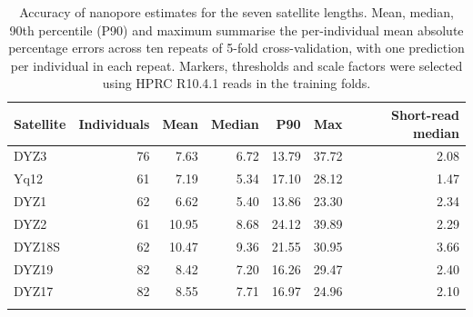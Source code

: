 \begin{table}[tbp]
\caption{Accuracy of nanopore estimates for the seven satellite lengths. Mean, median, 90th percentile (P90) and maximum summarise the per-individual mean absolute percentage errors across ten repeats of 5-fold cross-validation, with one prediction per individual in each repeat. Markers, thresholds and scale factors were selected using HPRC R10.4.1 reads in the training folds.}\label{tab:ont}
\centering\small
\begin{tabular}{lrrrrrr}
\toprule
Satellite & Individuals & Mean & Median & P90 & Max & Short-read median \\
\midrule
DYZ3 & 76 & 7.63 & 6.72 & 13.79 & 37.72 & 2.08 \\
Yq12 & 61 & 7.19 & 5.34 & 17.10 & 28.12 & 1.47 \\
DYZ1 & 62 & 6.62 & 5.40 & 13.86 & 23.30 & 2.34 \\
DYZ2 & 61 & 10.95 & 8.68 & 24.12 & 39.89 & 2.29 \\
DYZ18S & 62 & 10.47 & 9.36 & 21.55 & 30.95 & 3.66 \\
DYZ19 & 82 & 8.42 & 7.20 & 16.26 & 29.47 & 2.40 \\
DYZ17 & 82 & 8.55 & 7.71 & 16.97 & 24.96 & 2.10 \\
\botrule
\end{tabular}
\end{table}
\endgroup

\clearpage

